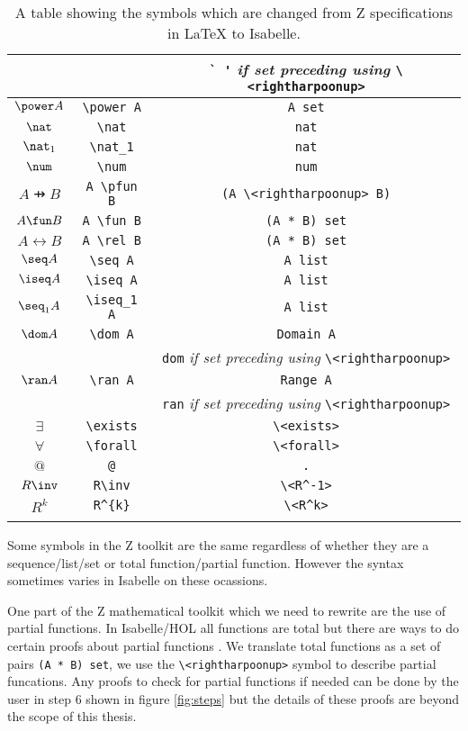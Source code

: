 {\begin{longtable}[H]{|c | c | c |}
& & \verb|` '| \textit{if set preceding using} \verb|\<rightharpoonup>| \\
\hline
$\power A$ & \verb|\power A| & \verb|A set| \\
\hline
$\nat$ & \verb|\nat| & \verb|nat| \\
\hline
$\nat_1$ & \verb|\nat_1| & \verb|nat| \\
\hline
$\num$ & \verb|\num| & \verb|num| \\
\hline
$A \pfun B$ & \verb|A \pfun B| & \verb|(A \<rightharpoonup> B)| \\
\hline
$A \fun B$ & \verb|A \fun B| & \verb|(A * B) set| \\
\hline
$A \rel B$ & \verb|A \rel B| & \verb|(A * B) set| \\
\hline
$\seq A$ & \verb|\seq A| & \verb|A list| \\
\hline
$\iseq A$ & \verb|\iseq A| & \verb|A list| \\
\hline
$\seq_1 A$ & \verb|\iseq_1 A| & \verb|A list| \\
\hline
$\dom A$ & \verb|\dom A| & \verb|Domain A| \\
& & \verb|dom| \textit{if set preceding using} \verb|\<rightharpoonup>| \\
\hline
$\ran A$ & \verb|\ran A| & \verb|Range A| \\
& & \verb|ran| \textit{if set preceding using} \verb|\<rightharpoonup>| \\
\hline
$\exists$ & \verb|\exists| & \verb|\<exists>| \\
\hline
$\forall$ & \verb|\forall| & \verb|\<forall>| \\
\hline
$@$ & \verb|@| & \verb|.| \\
\hline
$R\inv$ & \verb|R\inv| & \verb|\<R^-1>| \\
\hline
$R^{k}$ & \verb|R^{k}| & \verb|\<R^k>| \\
\hline
\caption{A table showing the symbols which are changed from Z specifications in \LaTeX{} to Isabelle.}
\label{tab:latextoisabelle}
\end{longtable}
}

Some symbols in the Z toolkit are the same regardless of whether they are a
sequence/list/set or total function/partial function. However the syntax
sometimes varies in Isabelle on these ocassions.

One part of the Z mathematical toolkit which we need to rewrite are the use of
partial functions. In Isabelle/HOL all functions are total but there are ways to
do certain proofs about partial functions \cite{Krauss08definingrecursive}. We
translate total functions as a set of pairs \verb|(A * B) set|, we use the
\verb|\<rightharpoonup>| symbol to describe partial funcations. Any proofs to
check for partial functions if needed can be done by the user in step 6 shown in
figure \ref{fig:steps} but the details of these proofs are beyond the scope of
this thesis.

